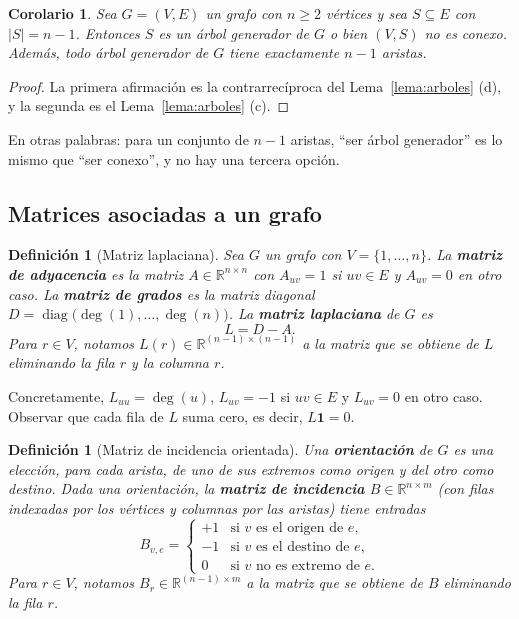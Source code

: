 \documentclass[12pt,a4paper]{article}
\theoremstyle{profesional}
\newtheorem{corolario}[teorema]{Corolario}
\theoremstyle{definicion-style}
\newtheorem{definicion}[teorema]{Definición}
\theoremstyle{observacion-style}
\newcommand{\R}{\mathbb{R}}
\newcommand{\abs}[1]{\left| #1 \right|}
\begin{document}
\begin{corolario}\label{cor:subconjuntos}
    Sea \( G = (V, E) \) un grafo con \( n \geq 2 \) vértices y sea \( S \subseteq E \) con \( \abs{S} = n - 1 \). Entonces \( S \) es un árbol generador de \( G \) o bien \( (V, S) \) no es conexo. Además, todo árbol generador de \( G \) tiene exactamente \( n - 1 \) aristas.
\end{corolario}
\begin{proof}
    La primera afirmación es la contrarrecíproca del Lema~\ref{lema:arboles} (d), y la segunda es el Lema~\ref{lema:arboles} (c).
\end{proof}

En otras palabras: para un conjunto de \( n - 1 \) aristas, ``ser árbol generador'' es lo mismo que ``ser conexo'', y no hay una tercera opción.

\subsection{Matrices asociadas a un grafo}

\begin{definicion}[Matriz laplaciana]
    Sea \( G \) un grafo con \( V = \{1, \ldots, n\} \). La \textbf{matriz de adyacencia} es la matriz \( A \in \R^{n \times n} \) con \( A_{uv} = 1 \) si \( uv \in E \) y \( A_{uv} = 0 \) en otro caso. La \textbf{matriz de grados} es la matriz diagonal \( D = \operatorname{diag}\big(\deg(1), \ldots, \deg(n)\big) \). La \textbf{matriz laplaciana} de \( G \) es
    \[
        L = D - A.
    \]
    Para \( r \in V \), notamos \( L(r) \in \R^{(n-1) \times (n-1)} \) a la matriz que se obtiene de \( L \) eliminando la fila \( r \) y la columna \( r \).
\end{definicion}

Concretamente, \( L_{uu} = \deg(u) \), \( L_{uv} = -1 \) si \( uv \in E \) y \( L_{uv} = 0 \) en otro caso. Observar que cada fila de \( L \) suma cero, es decir, \( L \mathbf{1} = 0 \).

\begin{definicion}[Matriz de incidencia orientada]\label{def:incidencia}
    Una \textbf{orientación} de \( G \) es una elección, para cada arista, de uno de sus extremos como \emph{origen} y del otro como \emph{destino}. Dada una orientación, la \textbf{matriz de incidencia} \( B \in \R^{n \times m} \) (con filas indexadas por los vértices y columnas por las aristas) tiene entradas
    \[
        B_{v,e} = \begin{cases}
            +1 & \text{si } v \text{ es el origen de } e,  \\
            -1 & \text{si } v \text{ es el destino de } e, \\
            0  & \text{si } v \text{ no es extremo de } e.
        \end{cases}
    \]
    Para \( r \in V \), notamos \( B_r \in \R^{(n-1) \times m} \) a la matriz que se obtiene de \( B \) eliminando la fila \( r \).
\end{definicion}
\end{document}
